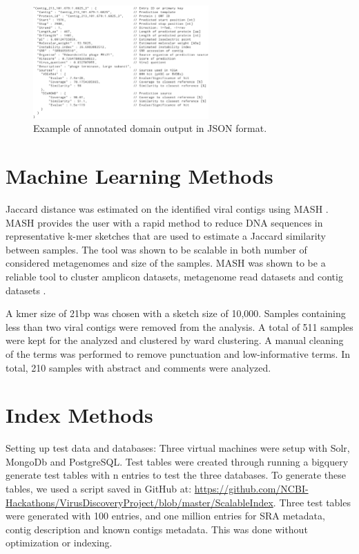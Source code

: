   \begin{figure}[h]
    \centering
    \includegraphics[width=0.6\textwidth]{figs/viga_json.pdf}
    \caption{Example of annotated  domain output in JSON format.
            \label{fig:sm_dm_outp}}
  \end{figure}

\section{Machine Learning Methods}
  \label{sec:sm_ml}
  Jaccard distance was estimated on the identified viral contigs using MASH
  \cite{Ondov2019}. MASH provides the user with a rapid method to reduce DNA sequences in
  representative k-mer sketches that are used to estimate a Jaccard similarity
  between samples. The tool was shown to be scalable in both number of
  considered metagenomes and size of the samples. MASH was shown to be a
  reliable tool to cluster amplicon datasets, metagenome read datasets and
  contig datasets \cite{Choi2018}.

  A kmer size of 21bp was chosen with a sketch size of 10,000. Samples
  containing less than two viral contigs were removed from the analysis.
  A total of 511 samples were kept for the analyzed and clustered by ward
  clustering. A manual cleaning of the terms was performed to remove
  punctuation and low-informative terms. In total, 210 samples with abstract
  and comments were analyzed.

\section{Index Methods}
  \label{sec:sm_idx}
  Setting up test data and databases: Three virtual machines were setup with
  Solr, MongoDb and PostgreSQL. Test tables were created through running a
  bigquery generate test tables with n entries to test the three databases. To
  generate these tables, we used a script saved in GitHub at:
  \url{https://github.com/NCBI-Hackathons/VirusDiscoveryProject/blob/master/ScalableIndex}.
  Three test tables were generated with 100 entries, and one million entries
  for SRA metadata, contig description and known contigs metadata. This was
  done without optimization or indexing.

